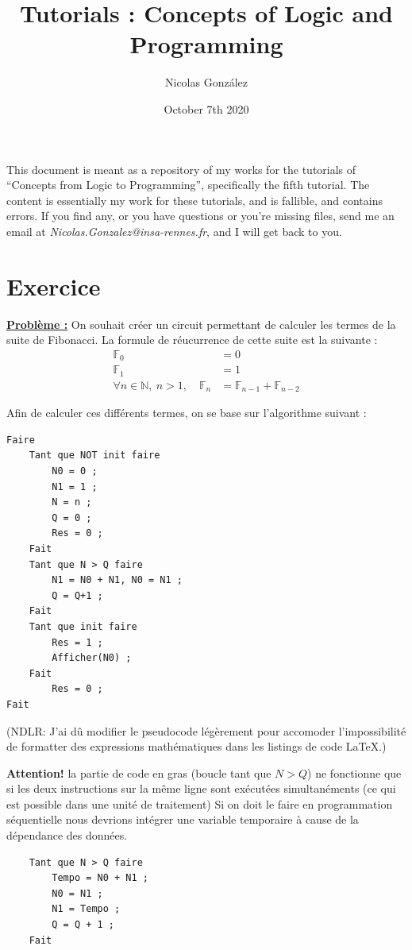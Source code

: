 \documentclass[a4paper,10pt]{article}
\title{Tutorials : Concepts of Logic and Programming}
\author{Nicolas González}
\date{October 7th 2020}
\newcommand{\N}{\mathbb{N}}
\begin{document}
\maketitle

This document is meant as a repository of my works for the tutorials of ``Concepts from Logic to Programming'', specifically the fifth tutorial. The content is essentially my work for these tutorials, and is fallible, and contains errors. If you find any, or you have questions or you're missing files, send me an email at \textit{Nicolas.Gonzalez@insa-rennes.fr}, and I will get back to you.


\newpage

\section{Exercice}

\underline{\textbf{Problème :}}
On souhait créer un circuit permettant de calculer les termes de la suite de Fibonacci. La formule de réucurrence de cette suite est la suivante :
\begin{align*}
	\mathbb{F}_0&=0\\
	\mathbb{F}_1&=1\\
	\forall n\in\N,\ n>1,\quad\mathbb{F}_n&=\mathbb{F}_{n-1}+\mathbb{F}_{n-2}
\end{align*}

Afin de calculer ces différents termes, on se base sur l'algorithme suivant :
\begin{lstlisting}
Faire
	Tant que NOT init faire
		N0 = 0 ;
		N1 = 1 ;
		N = n ;
		Q = 0 ;
		Res = 0 ;
	Fait
	Tant que N > Q faire
		N1 = N0 + N1, N0 = N1 ;
		Q = Q+1 ;
	Fait
	Tant que init faire
		Res = 1 ;
		Afficher(N0) ;
	Fait
		Res = 0 ;
Fait
\end{lstlisting}

(NDLR: J'ai dû modifier le pseudocode légèrement pour accomoder l'impossibilité de formatter des expressions mathématiques dans les listings de code \LaTeX.)

\textbf{Attention!} la partie de code en gras (boucle tant que $N>Q$) ne fonctionne que si les deux instructions sur la même ligne sont exécutées simultanéments (ce qui est possible dans une unité de traitement) Si on doit le faire en programmation séquentielle nous devrions intégrer une variable temporaire à cause de la dépendance des données.

\begin{lstlisting}
	Tant que N > Q faire
		Tempo = N0 + N1 ;
		N0 = N1 ;
		N1 = Tempo ;
		Q = Q + 1 ;
	Fait
\end{lstlisting}
\end{document}
